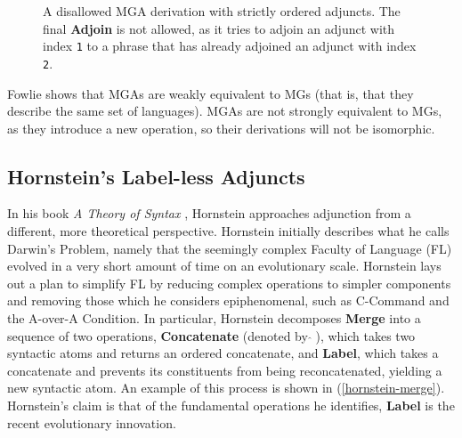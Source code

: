 \documentclass{article}
\begin{document}
\begin{figure}[h]
  \centering


    \caption{A disallowed MGA derivation with strictly ordered
      adjuncts.  The final \textbf{Adjoin} is not allowed, as it tries
      to adjoin an adjunct with index \texttt{1} to a phrase that has
      already adjoined an adjunct with index \texttt{2}.}
  \label{fig:fowlie-order-bad}
\end{figure}

Fowlie shows that MGAs are weakly equivalent to MGs (that is, that
they describe the same set of languages).  MGAs are not strongly
equivalent to MGs, as they introduce a new operation, so their
derivations will not be isomorphic.


\subsection{Hornstein's Label-less Adjuncts}
\label{sec:hornstein-adjuncts}

In his book \textit{A Theory of Syntax} \cite{hornstein2008b},
Hornstein approaches adjunction from a different, more theoretical
perspective.  Hornstein initially describes what he calls Darwin's
Problem, namely that the seemingly complex Faculty of Language (FL)
evolved in a very short amount of time on an evolutionary scale.
Hornstein lays out a plan to simplify FL by reducing complex
operations to simpler components and removing those which he considers
epiphenomenal, such as C-Command and the A-over-A Condition.  In
particular, Hornstein decomposes \textbf{Merge} into a sequence of two
operations, \textbf{Concatenate} (denoted by $\widehat{}\;$), which
takes two syntactic atoms and returns an ordered concatenate, and
\textbf{Label}, which takes a concatenate and prevents its
constituents from being reconcatenated, yielding a new syntactic atom.
An example of this process is shown in (\ref{hornstein-merge}).
Hornstein's claim is that of the fundamental operations he identifies,
\textbf{Label} is the recent evolutionary innovation.
\end{document}
